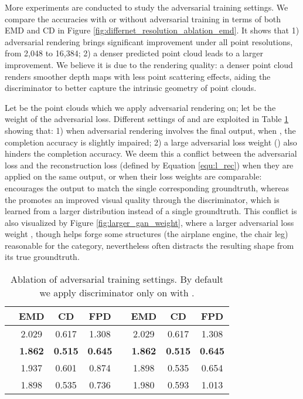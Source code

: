 \documentclass[final]{cvpr}
\begin{document}
More experiments are conducted to study the adversarial training settings. We compare the accuracies with or without adversarial training in terms of both EMD and CD in Figure \ref{fig:differnet_resolution_ablation_emd}. It shows that 1) adversarial rendering brings significant improvement under all point resolutions, from 2,048 to 16,384; 2) a denser predicted point cloud leads to a larger improvement. We believe it is due to the rendering quality: a denser point cloud renders smoother depth maps with less point scattering effects, aiding the discriminator to better capture the intrinsic geometry of point clouds.

Let  be the point clouds which we apply adversarial rendering on; let  be the weight of the adversarial loss. 
Different settings of  and  are exploited in Table \ref{table:ablation_gan} showing that:
1) when adversarial rendering involves the final output, \ie when , the completion accuracy is slightly impaired; 2) a large adversarial loss weight () also hinders the completion accuracy.
We deem this a conflict between the adversarial loss  and the reconstruction loss  (defined by Equation \ref{equ:l_rec}) when they are applied on the same output, or when their loss weights are comparable: 
 encourages the output to match the single corresponding groundtruth, whereas the  promotes an improved visual quality through the discriminator, which is learned from a larger distribution instead of a single groundtruth. This conflict is also visualized by Figure \ref{fig:larger_gan_weight}, where a larger adversarial loss weight , though helps forge some structures (\eg the airplane engine, the chair leg) reasonable for the category, nevertheless often distracts the resulting shape from its true groundtruth.


\begin{table}[t]
\begin{center}
\footnotesize
\setlength\tabcolsep{2.0pt}
\begin{tabular}{@{}c|ccc||c|ccc@{}}
\toprule
   &  EMD & CD & FPD &  & EMD & CD & FPD \\
\midrule
 & 2.029 & 0.617 & 1.308 &  & 2.029 & 0.617 & 1.308 \\
 & \textbf{1.862} & \textbf{0.515} & \textbf{0.645} &  & \textbf{1.862} & \textbf{0.515} & \textbf{0.645} \\
  & 1.937 & 0.601 & 0.874 &  & 1.898 & 0.535 & 0.654\\
 & 1.898 & 0.535 & 0.736 &  & 1.980 & 0.593 & 1.013\\
\bottomrule
\end{tabular}
\end{center}
\caption{Ablation of adversarial training settings. By default we apply discriminator only on  with .}
\label{table:ablation_gan}
\vspace{-1em}
\end{table}
\end{document}
